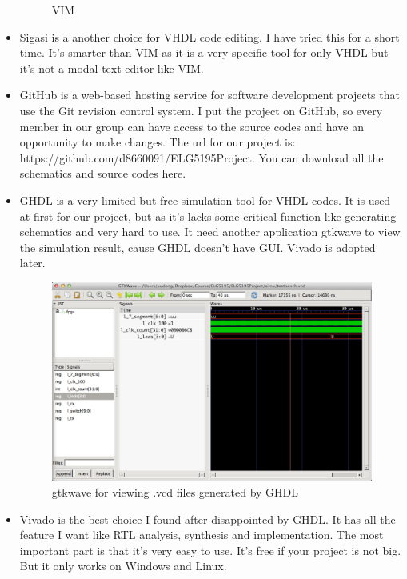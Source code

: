 \documentclass[12pt,a4paper]{report}
\begin{document}
\begin{itemize}
\begin{figure}[h]
      \caption{VIM}
      \label{fig:vim}
    \end{figure}
  \item Sigasi is a another choice for VHDL code editing. I have tried this for a short time. It's smarter than VIM as it is a very specific tool for only VHDL but it's not a modal text editor like VIM.
  \item GitHub is a web-based hosting service for software development projects that use the Git revision control system. I put the project on GitHub, so every member in our group can have access to the source codes and have an opportunity to make changes. The url for our project is: https://github.com/d8660091/ELG5195Project. You can download all the schematics and source codes here.
  \item GHDL is a very limited but free simulation tool for VHDL codes. It is used at first for our project, but as it's lacks some critical function like generating schematics and very hard to use. It need another application gtkwave to view the simulation result, cause GHDL doesn't have GUI. Vivado is adopted later.
    \begin{figure}[h]
      \centering
      \includegraphics[width=\textwidth]{ghdl}
      \caption{gtkwave for viewing .vcd files generated by GHDL}
      \label{fig:ghdl}
    \end{figure}
  \item Vivado is the best choice I found after disappointed by GHDL\@. It has all the feature I want like RTL analysis, synthesis and implementation. The most important part is that it's very easy to use. It's free if your project is not big. But it only works on Windows and Linux.
\end{itemize}
\end{document}
